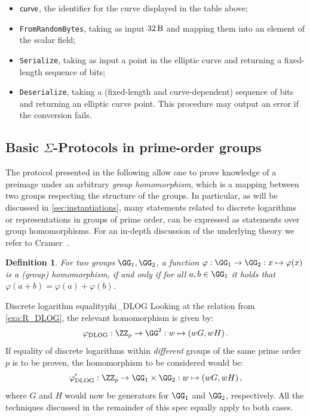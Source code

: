 \documentclass[11pt]{article}
\newtheorem{definition}{Definition}
\begin{document}
\begin{itemize}
  \item $\textsf{curve}$, the identifier for the curve displayed in the table above;
  \item \texttt{FromRandomBytes}, taking as input $\seedlen$ and mapping them into an element of the scalar field;
  \item \texttt{Serialize}, taking as input a point in the elliptic curve and returning a fixed-length sequence of bits;
  \item \texttt{Deserialize}, taking a (fixed-length and curve-dependent) sequence of bits and returning an elliptic curve point. This procedure may output an error if the conversion fails.
\end{itemize}


\subsection{Basic $\Sigma$-Protocols in prime-order groups}\label{sec:basic_sigma}

The protocol presented in the following allow one to prove knowledge of a preimage under an arbitrary \emph{group homomorphism}, which is a mapping between two groups respecting the structure of the groups.
In particular, as will be discussed in \cref{sec:instantiations}, many statements related to discrete logarithms or representations in groups of prime order, can be expressed as statements over group homomorphisms.
For an in-depth discussion of the underlying theory we refer to Cramer~\cite{cramer97}.

\begin{definition}
  For two groups $\GG_1,\GG_2$, a function $\varphi:\GG_1\to\GG_2:x\mapsto\varphi(x)$ is a \emph{(group) homomorphism}, if and only if for all $a,b\in\GG_1$ it holds that $\varphi(a+b)=\varphi(a)+\varphi(b)$.
\end{definition}

\begin{example}{Discrete logarithm equality}{phi_DLOG}
  Looking at the relation from \cref{exa:R_DLOG}, the relevant homomorphism is given by:
	$$
	  \varphi_{\operatorname{DLOG}} : \ZZ_p\to\GG^2 : \witness\mapsto (\witness G,\witness H)\,.
	$$
	If equality of discrete logarithms within \emph{different} groups of the same prime order $p$ is to be proven, the homomorphism to be considered would be:
	$$
	  \varphi_{\operatorname{DLOG}}' : \ZZ_p\to\GG_1\times\GG_2 : \witness\mapsto (\witness G,\witness H)\,,
	$$
	where $G$ and $H$ would now be generators for $\GG_1$ and $\GG_2$, respectively.
	All the techniques discussed in the remainder of this spec equally apply to both cases.
\end{example}
\end{document}
